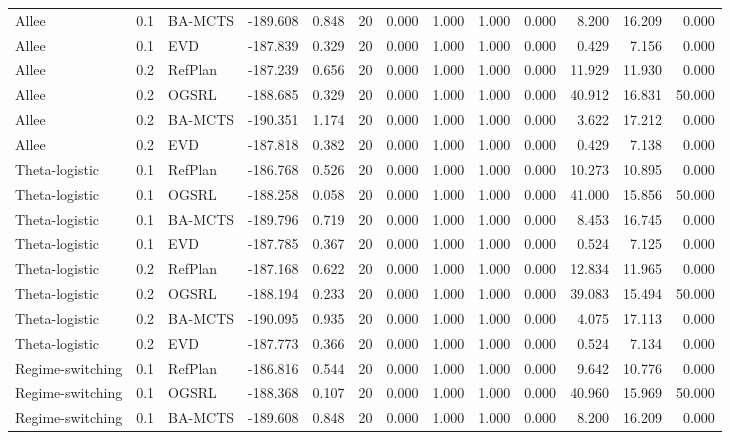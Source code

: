 \documentclass[10pt]{article}
\begin{document}
\begin{landscape}
\begin{center}
\begin{longtable}{@{}lllr@{}r@{}r@{}rrrrrrr@{}}
Allee & 0.1 & BA-MCTS & -189.608 & 0.848 & 20 & 0.000 & 1.000 & 1.000 & 0.000 & 8.200 & 16.209 & 0.000 \\
Allee & 0.1 & EVD & -187.839 & 0.329 & 20 & 0.000 & 1.000 & 1.000 & 0.000 & 0.429 & 7.156 & 0.000 \\
\addlinespace[1.5pt]
Allee & 0.2 & RefPlan & -187.239 & 0.656 & 20 & 0.000 & 1.000 & 1.000 & 0.000 & 11.929 & 11.930 & 0.000 \\
Allee & 0.2 & OGSRL & -188.685 & 0.329 & 20 & 0.000 & 1.000 & 1.000 & 0.000 & 40.912 & 16.831 & 50.000 \\
Allee & 0.2 & BA-MCTS & -190.351 & 1.174 & 20 & 0.000 & 1.000 & 1.000 & 0.000 & 3.622 & 17.212 & 0.000 \\
Allee & 0.2 & EVD & -187.818 & 0.382 & 20 & 0.000 & 1.000 & 1.000 & 0.000 & 0.429 & 7.138 & 0.000 \\
\addlinespace[1.5pt]
Theta-logistic & 0.1 & RefPlan & -186.768 & 0.526 & 20 & 0.000 & 1.000 & 1.000 & 0.000 & 10.273 & 10.895 & 0.000 \\
Theta-logistic & 0.1 & OGSRL & -188.258 & 0.058 & 20 & 0.000 & 1.000 & 1.000 & 0.000 & 41.000 & 15.856 & 50.000 \\
Theta-logistic & 0.1 & BA-MCTS & -189.796 & 0.719 & 20 & 0.000 & 1.000 & 1.000 & 0.000 & 8.453 & 16.745 & 0.000 \\
Theta-logistic & 0.1 & EVD & -187.785 & 0.367 & 20 & 0.000 & 1.000 & 1.000 & 0.000 & 0.524 & 7.125 & 0.000 \\
\addlinespace[1.5pt]
Theta-logistic & 0.2 & RefPlan & -187.168 & 0.622 & 20 & 0.000 & 1.000 & 1.000 & 0.000 & 12.834 & 11.965 & 0.000 \\
Theta-logistic & 0.2 & OGSRL & -188.194 & 0.233 & 20 & 0.000 & 1.000 & 1.000 & 0.000 & 39.083 & 15.494 & 50.000 \\
Theta-logistic & 0.2 & BA-MCTS & -190.095 & 0.935 & 20 & 0.000 & 1.000 & 1.000 & 0.000 & 4.075 & 17.113 & 0.000 \\
Theta-logistic & 0.2 & EVD & -187.773 & 0.366 & 20 & 0.000 & 1.000 & 1.000 & 0.000 & 0.524 & 7.134 & 0.000 \\
\addlinespace[1.5pt]
Regime-switching & 0.1 & RefPlan & -186.816 & 0.544 & 20 & 0.000 & 1.000 & 1.000 & 0.000 & 9.642 & 10.776 & 0.000 \\
Regime-switching & 0.1 & OGSRL & -188.368 & 0.107 & 20 & 0.000 & 1.000 & 1.000 & 0.000 & 40.960 & 15.969 & 50.000 \\
Regime-switching & 0.1 & BA-MCTS & -189.608 & 0.848 & 20 & 0.000 & 1.000 & 1.000 & 0.000 & 8.200 & 16.209 & 0.000 \\

\end{longtable}
\end{center}
\end{landscape}
\end{document}
